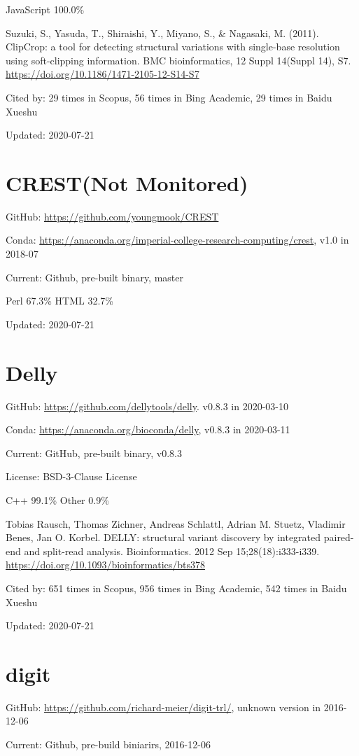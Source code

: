 \documentclass[]{article}
\newcommand{\nm}{{\color{red}(Not Monitored)}}
\newcommand{\cb}[3]{\par Cited by: {\color{blue}\Huge #1} times in Scopus, {\color{blue}\Huge #2} times in Bing Academic, {\color{blue}\Huge #3} times in Baidu Xueshu}
\begin{document}
JavaScript 100.0\%

Suzuki, S., Yasuda, T., Shiraishi, Y., Miyano, S., \& Nagasaki, M. (2011). ClipCrop: a tool for detecting structural variations with single-base resolution using soft-clipping information. BMC bioinformatics, 12 Suppl 14(Suppl 14), S7. \url{https://doi.org/10.1186/1471-2105-12-S14-S7}\cb{29}{56}{29}

Updated: 2020-07-21

\section{CREST\nm}

GitHub: \url{https://github.com/youngmook/CREST}

Conda: \url{https://anaconda.org/imperial-college-research-computing/crest}, v1.0 in 2018-07

Current: Github, pre-built binary, master

Perl 67.3\% HTML 32.7\%

Updated: 2020-07-21

\section{Delly}

GitHub: \url{https://github.com/dellytools/delly}. v0.8.3 in 2020-03-10

Conda: \url{https://anaconda.org/bioconda/delly}, v0.8.3 in 2020-03-11

Current: GitHub, pre-built binary, v0.8.3

License:  BSD-3-Clause License 

C++ 99.1\% Other 0.9\%

Tobias Rausch, Thomas Zichner, Andreas Schlattl, Adrian M. Stuetz, Vladimir Benes, Jan O. Korbel. DELLY: structural variant discovery by integrated paired-end and split-read analysis. Bioinformatics. 2012 Sep 15;28(18):i333-i339. \url{https://doi.org/10.1093/bioinformatics/bts378}\cb{651}{956}{542}

Updated: 2020-07-21

\section{digit}

GitHub: \url{https://github.com/richard-meier/digit-trl/}, unknown version in 2016-12-06

Current: Github, pre-build biniarirs, 2016-12-06
\end{document}
